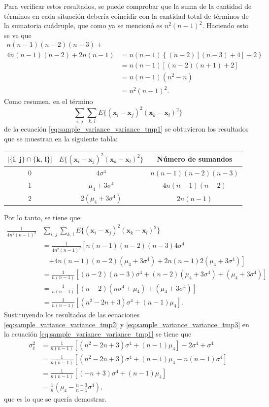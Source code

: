 \documentclass[a4paper]{report}
\newcommand{\x}{\mathbf{x}}
\begin{document}
Para verificar estos resultados, se puede comprobar que la suma de la cantidad de términos en cada situación debería coincidir con la cantidad total de términos de la sumatoria cuádruple, que como ya se mencionó es \(n^2(n-1)^2\). Haciendo esto se ve que
\begin{align*}
  n(n-1)(n-2)(n-3)+\\
  4n(n-1)(n-2)+2n(n-1)&=n(n-1)\left\{(n-2)\left[(n-3)+4\right]+2\right\}\\
   &=n(n-1)\left[(n-2)(n+1)+2\right]\\
   &=n(n-1)(n^2-n)\\
   &=n^2(n-1)^2.
\end{align*}
Como resumen, en el término 
\[
 \sum_{i,\,j}\sum_{k,\,l}E\{(\x_i-\x_j)^2(\x_k-\x_l)^2\}
\]
de la ecuación \ref{eq:sample_variance_variance_tmp1} se obtuvieron los resultados que se muestran en la siguiente tabla:
\begin{center}
\def\arraystretch{1.2}
  \begin{tabular}{| c | c | c |}
    \hline
    \(\bm{|\{i,\,j\}\cap\{k,\,l\}|}\) & \(E\{(\x_i-\x_j)^2(\x_k-\x_l)^2\}\) & \textbf{Número de sumandos} \\ \hline
    0 & \(4\sigma^4\) & \(n(n-1)(n-2)(n-3)\) \\ \hline
    1 & \(\mu_4+3\sigma^4\) & \(4n(n-1)(n-2)\) \\ \hline
    2 & \(2(\mu_4+3\sigma^4)\) & \(2n(n-1)\) \\ \hline
  \end{tabular}
\end{center}
Por lo tanto, se tiene que
\begin{align}\label{eq:sample_variance_variance_tmp3}
 \frac{1}{4n^2(n-1)^2}&\sum_{i,\,j}\sum_{k,\,l}E\{(\x_i-\x_j)^2(\x_k-\x_l)^2\}\nonumber\\
 &=\frac{1}{4n^2(n-1)^2}\left[n(n-1)(n-2)(n-3)4\sigma^4\right.\nonumber\\
 &\quad\left.+4n(n-1)(n-2)(\mu_4+3\sigma^4)+2n(n-1)2(\mu_4+3\sigma^4)\right]\nonumber\\
 &=\frac{1}{n(n-1)}\left[(n-2)(n-3)\sigma^4+(n-2)(\mu_4+3\sigma^4)+(\mu_4+3\sigma^4)\right]\nonumber\\
 &=\frac{1}{n(n-1)}\left[(n-2)(n\sigma^4+\mu_4)+(\mu_4+3\sigma^4)\right]\nonumber\\
 &=\frac{1}{n(n-1)}\left[(n^2-2n+3)\sigma^4+(n-1)\mu_4\right].
\end{align}
Sustituyendo los resultados de las ecuaciones \ref{eq:sample_variance_variance_tmp2} y \ref{eq:sample_variance_variance_tmp3} en la ecuación \ref{eq:sample_variance_variance_tmp1} se tiene que
\begin{align*}\label{eq:sample_variance_variance_tmp1}
 \sigma_{\bar{v}}^2&=\frac{1}{n(n-1)}\left[(n^2-2n+3)\sigma^4+(n-1)\mu_4\right]-2\sigma^4+\sigma^4\\
   &=\frac{1}{n(n-1)}\left[(n^2-2n+3)\sigma^4+(n-1)\mu_4-n(n-1)\sigma^4\right]\\
   &=\frac{1}{n(n-1)}\left[(-n+3)\sigma^4+(n-1)\mu_4\right]\\
   &=\frac{1}{n}\left(\mu_4-\frac{n-3}{n-1}\sigma^4\right),
\end{align*}
que es lo que se quería demostrar.
\end{document}
